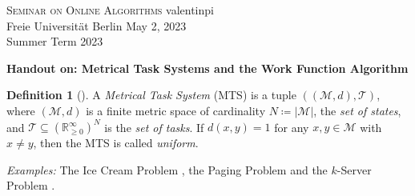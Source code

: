 \documentclass[10pt]{amsart}
\theoremstyle{definition}
\newtheorem{definition}{Definition}
\theoremstyle{remark}
\begin{document}
    \begin{mdframed}
        \textsc{Seminar on Online Algorithms} \hfill valentinpi\\
        Freie Universität Berlin \hfill May 2, 2023\\
        Summer Term 2023
    \end{mdframed}

    \phantom{}
    
    \textbf{Handout on: Metrical Task Systems and the Work Function Algorithm}

    \begin{definition}[{\cite[pp. 75-76]{Woeginger}}] \label{mts_definition}
        A \emph{Metrical Task System} (MTS) is a tuple \(((\mathcal{M}, d), \mathcal{T})\), where \((\mathcal{M}, d)\) is a finite metric space \cite[pp. 3-4]{Forster2017} of cardinality \(N \coloneqq |\mathcal{M}|\), the \emph{set of states}, and \(\mathcal{T} \subseteq \left(\mathbb{R}_{\geq 0}^\infty\right)^N\) is the \emph{set of tasks}. If \(d(x, y) = 1\) for any \(x, y \in \mathcal{M}\) with \(x \neq y\), then the MTS is called \emph{uniform}.
    \end{definition}

    \begin{figure}[!hbtp]
        \centering
    \end{figure}

    \emph{Examples:} The Ice Cream Problem \cite[pp. 74-75]{Woeginger}, the Paging Problem \cite[p. 124]{Borodin} and the \(k\)-Server Problem \cite[pp. 87-88]{Woeginger}.
\end{document}
